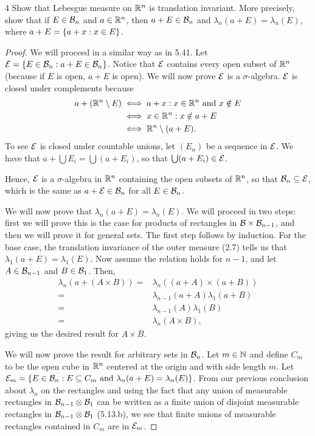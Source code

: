 \begin{exercise}{4}
Show that Lebesgue measure on $\mathbb{R}^n$ is translation invariant.
More precisely, show that if $E \in \mathcal{B}_n$ and $a \in \mathbb{R}^n$, then $a + E \in \mathcal{B}_n$ and $\lambda_n (a + E) = \lambda_n(E)$, where $a + E = \{a + x: x \in E\}$.
\end{exercise}
\begin{proof}
We will proceed in a similar way as in 5.41.
Let $\mathcal{E} = \{E \in \mathcal{B}_n: a+E \in \mathcal{B}_n\}$.
Notice that $\mathcal{E}$ contains every open subset of $\mathbb{R}^n$ (because if $E$ is open, $a + E$ is open).
We will now prove $\mathcal{E}$ is a $\sigma$-algebra.
$\mathcal{E}$ is closed under complements because
\begin{align*}
    a + (\mathbb{R}^n \setminus E) &\iff a+x: x \in \mathbb{R}^n \text{ and } x \notin E\\
    &\iff x \in \mathbb{R}^n: x \notin a + E\\
    &\iff \mathbb{R}^n \setminus (a+E).
\end{align*}
To see $\mathcal{E}$ is closed under countable unions, let $(E_n)$ be a sequence in $\mathcal{E}$.
We have that $a + \bigcup E_i = \bigcup (a + E_i)$, so that $\bigcup (a + E_i) \in \mathcal{E}$.

Hence, $\mathcal{E}$ is a $\sigma$-algebra in $\mathbb{R}^n$ containing the open subsets of $\mathbb{R}^n$, so that $\mathcal{B}_n \subseteq \mathcal{E}$, which is the same as $a + \mathcal{E} \in \mathcal{B}_n$ for all $E \in \mathcal{B}_n$.

We will now prove that $\lambda_n(a + E) = \lambda_n(E)$.
We will proceed in two steps:
first we will prove this is the case for products of rectangles in $\mathcal{B} \times \mathcal{B}_{n-1}$, and then we will prove it for general sets.
The first step follows by induction.
For the base case, the translation invariance of the outer measure (2.7) tells us that $\lambda_1(a + E) = \lambda_1(E)$.
Now assume the relation holds for $n - 1$, and let $A \in \mathcal{B}_{n-1}$ and $B \in \mathcal{B}_1$.
Then,
\begin{align*}
    \lambda_n(a + (A \times B))
    =& \lambda_n((a + A) \times (a + B))\\
    =& \lambda_{n-1}(a + A) \lambda_1(a + B)\\
    =& \lambda_{n-1}(A) \lambda_1(B)\\
    =& \lambda_{n}(A \times B),
\end{align*}
giving us the desired result for $A \times B$.

We will now prove the result for arbitrary sets in $\mathcal{B}_n$.
Let $m \in \mathbb{N}$ and define $C_m$ to be the open cube in $\mathbb{R}^n$ centered at the origin and with side length $m$.
Let $\mathcal{E}_m = \{E \in \mathcal{B}_n: E \subseteq C_m \text{ and } \lambda_n(a + E) = \lambda_n(E)\}$.
From our previous conclusion about $\lambda_n$ on the rectangles and using the fact that any union of measurable rectangles in $\mathcal{B}_{n-1} \otimes \mathcal{B}_1$ can be written as a finite union of disjoint measurable rectangles in $\mathcal{B}_{n-1} \otimes \mathcal{B}_1$ (5.13.b), we see that finite unions of measurable rectangles contained in $C_m$ are in $\mathcal{E}_m$.


\end{proof}
